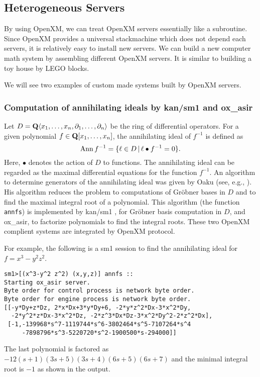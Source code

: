 
\subsection{Heterogeneous Servers}

\def\pd#1{ \partial_{#1} }

By using OpenXM, we can treat OpenXM servers essentially 
like a subroutine.
Since OpenXM provides a universal stackmachine which does not
depend each servers, 
it is relatively easy to install new servers.
We can build a new computer math system by assembling
different OpenXM servers.
It is similar to building a toy house by LEGO blocks.

We will see two examples of custom made systems
built by OpenXM servers.

\subsubsection{Computation of annihilating ideals by kan/sm1 and ox\_asir}

Let $D = {\bf Q} \langle x_1, \ldots, x_n , \pd{1}, \ldots, \pd{n} \rangle$
be the ring of differential operators.
For a given polynomial
$ f \in {\bf Q}[x_1, \ldots, x_n] $,
the annihilating ideal of $f^{-1}$ is defined as
$$ {\rm Ann}\, f^{-1} = \{ \ell \in D \,|\,
  \ell \bullet f^{-1} = 0 \}.
$$
Here, $\bullet$ denotes the action of $D$ to functions.
The annihilating ideal can be regarded as the maximal differential
equations for the function $f^{-1}$.
An algorithm to determine generators of the annihilating ideal
was given by Oaku (see, e.g., \cite[5.3]{sst-book}).
His algorithm reduces the problem to computations of Gr\"obner bases
in $D$ and to find the maximal integral root of a polynomial.
This algorithm (the function {\tt annfs}) is implemented by
kan/sm1 \cite{kan}, for Gr\"obner basis computation in $D$, and
ox\_asir, to factorize polynomials to find the integral
roots.
These two OpenXM complient systems are integrated by
OpenXM protocol.

For example, the following is a sm1 session to find the annihilating
ideal for $f = x^3 - y^2 z^2$.
\begin{verbatim}
sm1>[(x^3-y^2 z^2) (x,y,z)] annfs ::
Starting ox_asir server.
Byte order for control process is network byte order.
Byte order for engine process is network byte order.
[[-y*Dy+z*Dz, 2*x*Dx+3*y*Dy+6, -2*y*z^2*Dx-3*x^2*Dy, 
  -2*y^2*z*Dx-3*x^2*Dz, -2*z^3*Dx*Dz-3*x^2*Dy^2-2*z^2*Dx], 
 [-1,-139968*s^7-1119744*s^6-3802464*s^5-7107264*s^4
     -7898796*s^3-5220720*s^2-1900500*s-294000]] 
\end{verbatim}
The last polynomial is factored as
$-12(s+1)(3s+5)(3s+4)(6s+5)(6s+7)$
and the minimal integral root is $-1$
as shown in the output.


